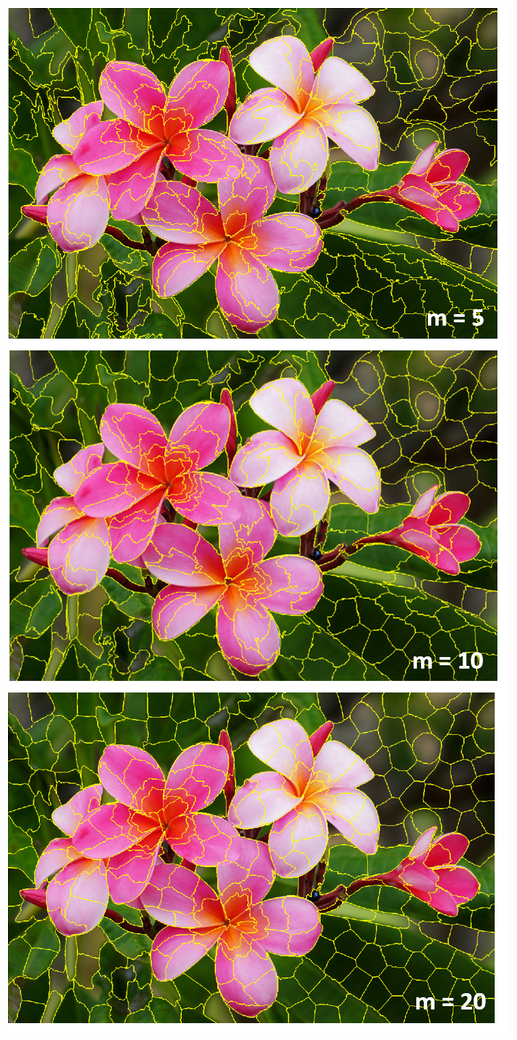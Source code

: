 \documentclass[11pt,twocolumn]{article}
\begin{document}
\begin{center}
\includegraphics[width = \linewidth]{flowers.png} \\ 
\end{center}
\end{document}
